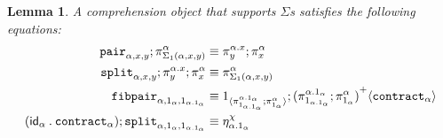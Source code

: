 \documentclass[10pt]{article}
\newtheorem{lemma}{Lemma}
\theoremstyle{definition}
\newcommand{\id}{\mathsf{id}}
\newcommand\bdot[0]{\mathbin{.}}
\newcommand\ApPlus[2]{\ensuremath{{#1}^+ \langle #2 \rangle }}
\begin{document}
\begin{lemma}
A comprehension object that supports $\Sigma$s satisfies the following equations:
\begin{align}
\pair{\alpha,x,y};\pi^\alpha_{\Sigma_1(\alpha, x, y)} &\equiv \pi^{\alpha.x}_y;\pi^\alpha_x \\
\tsplit{\alpha,x,y};\pi^{\alpha.x}_y;\pi^\alpha_x &\equiv \pi^\alpha_{\Sigma_1(\alpha, x, y)} \\
\fibpair{\alpha,1_\alpha,1_{\alpha.1_\alpha}} &\equiv \ApOne{\pi^{\alpha.1_\alpha}_{1_{\alpha.1_\alpha}};\pi^\alpha_{1_\alpha}};\ApPlus{(\pi^{\alpha.1_\alpha}_{1_{\alpha.1_\alpha}};\pi^\alpha_{1_\alpha})}{\contract{\alpha}} \\
(\id_\alpha \bdot \contract{\alpha});\tsplit{\alpha,1_\alpha,1_{\alpha.1_\alpha}} &\equiv \eta^\chi_{\alpha.1_\alpha}
\end{align}
\end{lemma}
\end{document}
